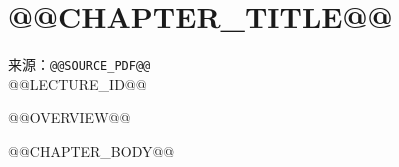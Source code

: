 \chapter{@@CHAPTER_TITLE@@}

\begin{sourcebox}
来源：\texttt{@@SOURCE_PDF@@}\\
@@LECTURE_ID@@
\end{sourcebox}

\begin{overviewbox}
@@OVERVIEW@@
\end{overviewbox}

@@CHAPTER_BODY@@
